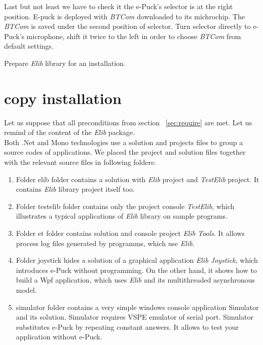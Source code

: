   Last but not least we have to check it the e-Puck's selector is at the right position.
  E-puck is deployed with {\it BTCom} downloaded to its michrochip. 
  The {\it BTCom} is saved under the second position of selector. 
  Turn selector directly to e-Puck's microphone, shift it twice to the left 
  in order to choose {\it BTCom} from default settings.

  Prepare {\it Elib} library for an installation.
  
  \section{copy installation} \label{sec:copy}
  Let us suppose that all preconditions from section ~\ref{sec:require} are met.
  Let us remind of the content of the {\it Elib} package.\\

  Both .Net and Mono technologies use a solution and projects files to group a source codes of applications.
  We placed the project and solution files together with the relevant source files in following folders:

  \begin{enumerate}
          \item Folder { \sf elib} folder contains a solution with {\it Elib} project and {\it TestElib} project.
                  It contains {\it Elib} library project itself too.
          \item Folder { \sf testelib} folder contains only the project console {\it TestElib}, 
          which illustrates a typical applications of {\it Elib} library on sample programs.
          \item Folder { \sf et} folder contains solution and console project {\it Elib Tools}. 
          It allows process log files generated by programms,
          which use {\it Elib}.
          \item Folder { \sf joystick} hides a solution of a graphical application {\it Elib Joystick},
          which introduces e-Puck without programming. On the other hand, it shows
          how to build a Wpf application, which uses {\it Elib} and its multithreaded asynchronous model.
          \item { \sf simulator} folder contains a very simple windows console application Simulator and its solution. 
          Simulator requires VSPE emulator of serial port. Simulator
           substitutes e-Puck by repeating constant answers. It allows to test your application without e-Puck.
  \end{enumerate}

